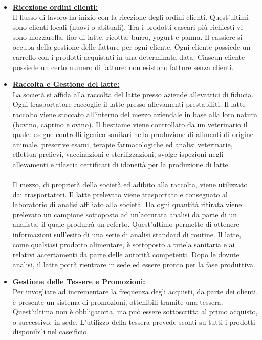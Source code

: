 \documentclass[12pt]{report}
\begin{document}
\begin{itemize}

 \item \textbf{\underline{Ricezione ordini clienti:}}\\
Il flusso di lavoro ha inizio con la ricezione degli ordini clienti. Quest'ultimi sono clienti locali (nuovi o abituali). Tra i prodotti caseari più richiesti vi sono mozzarella, fior di latte, ricotta, burro, yogurt e panna. Il cassiere si occupa della gestione delle fatture per ogni cliente. Ogni cliente possiede un carrello con i prodotti acquistati in una determinata data. Ciascun cliente possiede un certo numero di fatture: non esistono fatture senza clienti. 

 \item \textbf{\underline{Raccolta e Gestione del latte:}}\\
La società si affida alla raccolta del latte presso aziende allevatrici di fiducia. Ogni trasportatore raccoglie il latte presso allevamenti prestabiliti. Il latte raccolto viene stoccato all'interno del mezzo aziendale in base alla loro natura (bovino, caprino e ovino). Il bestiame viene controllato da un veterinario il quale: esegue controlli igenico-sanitari nella produzione di alimenti di origine animale, prescrive esami, terapie farmacologiche ed analisi veterinarie, effettua prelievi, vaccinazioni e sterilizzazioni, svolge ispezioni negli allevamenti e rilascia certificati di idoneità per la produzione di latte. \\ \\
Il mezzo, di proprietà della società ed adibito alla raccolta, viene utilizzato dai trasportatori. Il latte prelevato viene trasportato e consegnato al laboratorio di analisi affiliato alla società. Da ogni quantità ritirata viene prelevato un campione sottoposto ad un'accurata analisi da parte di un analista, il quale produrrà un referto. Quest'ultimo permette di ottenere informazioni sull'esito di una serie di analisi standard di routine. Il latte, come qualsiasi prodotto alimentare, è sottoposto a tutela sanitaria e ai relativi accertamenti da parte delle autorità competenti. Dopo le dovute analisi, il latte potrà rientrare in sede ed essere pronto per la fase produttiva. 

 \item \textbf{\underline{Gestione delle Tessere e Promozioni:}}\\
Per invogliare ad incrementare la frequenza degli acquisti, da parte dei clienti, è presente un sistema di promozioni, ottenibili tramite una tessera. Quest'ultima non è obbligatoria, ma può essere sottoscritta al primo acquisto, o successivo, in sede. L'utilizzo della tessera prevede sconti su tutti i prodotti disponibili nel caseificio. 
\end{itemize}
\end{document}
